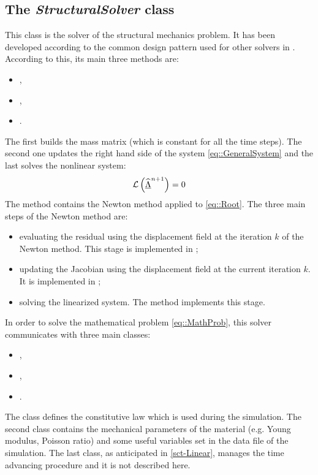 \subsection{The \textit{StructuralSolver} class}
This class is the
solver of the structural mechanics problem. It has been developed
according to the common design pattern used for other solvers in
\LV. According to this, its main three methods are:
\begin{itemize}
\item {},
\item {},
\item {}.
\end{itemize}
The first builds the mass matrix \mass (which is
constant for all the time steps). The second one updates the right hand
side of the system \eqref{eq::GeneralSystem} and the last solves the
nonlinear system:
\begin{equation}
  \mathcal{L}\left(\widehat{\underline{\Lambda}}^{n+1}\right)=0
  \label{eq::Root}
\end{equation}
The  method contains the Newton method
applied to \eqref{eq::Root}. The three main steps of the Newton method
are:
\begin{itemize}
\item evaluating the residual using the displacement field at the
  iteration $k$ of the Newton method. This stage is implemented in
  ;
\item updating the Jacobian using the displacement field at the
  current iteration $k$. It is implemented in
  ;
\item solving the linearized system. The method
   implements this stage.
\end{itemize} In order to solve the mathematical problem
\eqref{eq::MathProb}, this solver communicates with three main
classes:
\begin{itemize}
\item {},
\item {},
\item {}.
\end{itemize}
The  class defines the
constitutive law which is used during the simulation. The second class
contains the mechanical parameters of the material (e.g. Young
modulus, Poisson ratio) and some useful variables set in the data file
of the simulation. The last class, as anticipated in \ref{sct-Linear},
manages the time advancing procedure and it is not described here.\\

